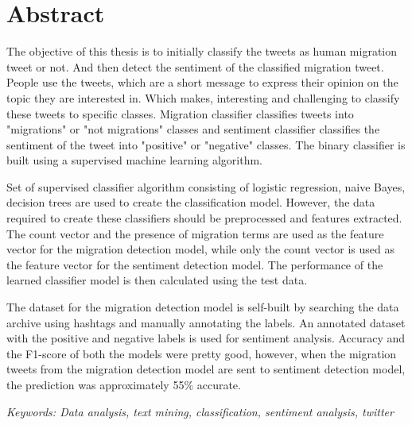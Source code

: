 \chapter*{Abstract}
The objective of this thesis is to initially classify the tweets as human migration tweet or not. And then detect the sentiment of the classified migration tweet.  People use the tweets, which are a short message to express their opinion on the topic they are interested in. Which makes, interesting and challenging to classify these tweets to specific classes. Migration classifier classifies tweets into "migrations" or "not migrations" classes and sentiment classifier classifies the sentiment of the tweet into "positive" or "negative" classes. The binary classifier is built using a supervised machine learning algorithm.

Set of supervised classifier algorithm consisting of logistic regression, naive Bayes, decision trees are used to create the classification model.  However, the data required to create these classifiers should be preprocessed and features extracted. The count vector and the presence of migration terms are used as the feature vector for the migration detection model, while only the count vector is used as the feature vector for the sentiment detection model. The performance of the learned classifier model is then calculated using the test data.

The dataset for the migration detection model is self-built by searching the data archive using hashtags and manually annotating the labels.  An annotated dataset with the positive and negative labels is used for sentiment analysis. Accuracy and the F1-score of both the models were pretty good, however, when the migration tweets from the migration detection model are sent to sentiment detection model, the prediction was approximately 55\% accurate.

\textit{Keywords: Data analysis, text mining, classification, sentiment analysis, twitter}